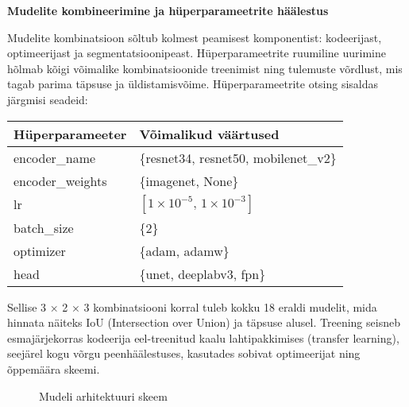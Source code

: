 \textbf{Mudelite kombineerimine ja hüperparameetrite häälestus}

Mudelite kombinatsioon sõltub kolmest peamisest komponentist: kodeerijast, optimeerijast ja segmentatsioonipeast. Hüperparameetrite ruumiline uurimine hõlmab kõigi võimalike kombinatsioonide treenimist ning tulemuste võrdlust, mis tagab parima täpsuse ja üldistamisvõime. Hüperparameetrite otsing sisaldas järgmisi seadeid:


\begin{table}[H]
    \caption{Hüperparameetrite kombinatsioonid}
    \label{tab:hyperparameter_kombinatsioonid}
    \begin{longtable}{ll}
        \hline
        \textbf{Hüperparameeter} & \textbf{Võimalikud väärtused} \\
        \hline
        encoder\_name      & \{resnet34, resnet50, mobilenet\_v2\} \\
        encoder\_weights   & \{imagenet, None\} \\
        lr                 & $[1\times10^{-5},\,1\times10^{-3}]$ \\
        batch\_size        & \{2\} \\
        optimizer          & \{adam, adamw\} \\
        head               & \{unet, deeplabv3, fpn\} \\
        \hline

    \end{longtable}
\end{table}
\addtocounter{table}{-1}



Sellise 3 × 2 × 3 kombinatsiooni korral tuleb kokku 18 eraldi mudelit, mida hinnata näiteks IoU (Intersection over Union) ja täpsuse alusel. Treening seisneb esmajärjekorras kodeerija eel-treenitud kaalu lahtipakkimises (transfer learning), seejärel kogu võrgu peenhäälestuses, kasutades sobivat optimeerijat ning õppemäära skeemi.


\begin{figure}[H]
    \centering
    \caption{Mudeli arhitektuuri skeem}
    \label{fig:model_architecture}
\end{figure}

